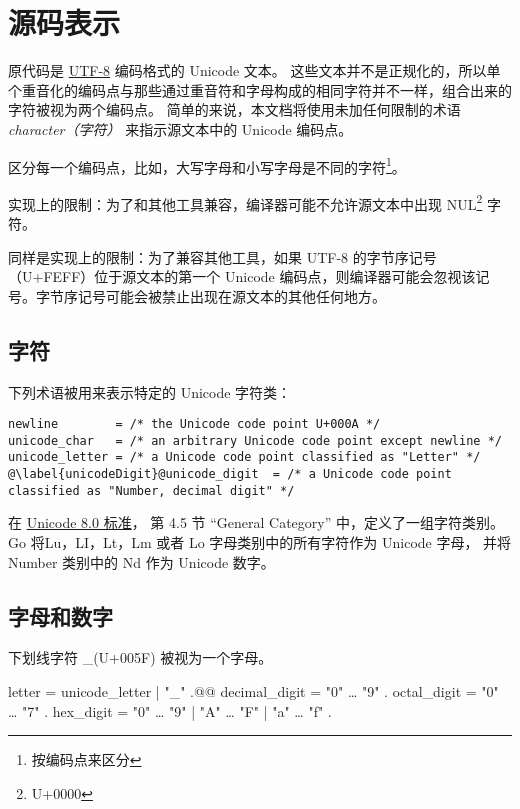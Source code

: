 
\chapter{源码表示}
原代码是 \href{http://en.wikipedia.org/wiki/UTF-8}{UTF-8} 编码格式的 Unicode 文本。
这些文本并不是正规化的，所以单个重音化的编码点与那些通过重音符和字母构成的相同字符并不一样，组合出来的字符被视为两个编码点。
简单的来说，本文档将使用未加任何限制的术语 \emph{character（字符）} 来指示源文本中的 Unicode 编码点。

区分每一个编码点，比如，大写字母和小写字母是不同的字符\footnote{按编码点来区分}。

实现上的限制：为了和其他工具兼容，编译器可能不允许源文本中出现 NUL\footnote{U+0000} 字符。

同样是实现上的限制：为了兼容其他工具，如果 UTF-8 的字节序记号（U+FEFF）位于源文本的第一个 Unicode 编码点，则编译器可能会忽视该记号。字节序记号可能会被禁止出现在源文本的其他任何地方。

\section{字符}
下列术语被用来表示特定的 Unicode 字符类：
\begin{lstlisting}[style=EBNF]
newline        = /* the Unicode code point U+000A */
unicode_char   = /* an arbitrary Unicode code point except newline */
unicode_letter = /* a Unicode code point classified as "Letter" */
@\label{unicodeDigit}@unicode_digit  = /* a Unicode code point classified as "Number, decimal digit" */
\end{lstlisting}
在 \href{http://www.unicode.org/versions/Unicode8.0.0/}{Unicode 8.0 标准}，
第 4.5 节 ``General Category'' 中，定义了一组字符类别。
Go 将Lu，LI，Lt，Lm 或者 Lo 字母类别中的所有字符作为 Unicode 字母，
并将 Number 类别中的 Nd 作为 Unicode 数字。

\section{字母和数字}
下划线字符 \_(U+005F) 被视为一个字母。
\begin{EBNF}
letter        = unicode_letter | "_" .@\label{letter}@
decimal_digit = "0" … "9" .
octal_digit   = "0" … "7" .
hex_digit     = "0" … "9" | "A" … "F" | "a" … "f" .
\end{EBNF}



